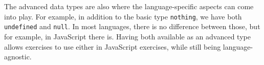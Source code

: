 \documentclass[../main]{subfiles}
\begin{document}
The advanced data types are also where the language-specific aspects can come into play.
For example, in addition to the basic type \texttt{nothing}, we have both \texttt{undefined} and \texttt{null}.
In most languages, there is no difference between those, but for example, in JavaScript there is.
Having both available as an advanced type allows exercises to use either in JavaScript exercises, while still being language-agnostic.

\end{document}
